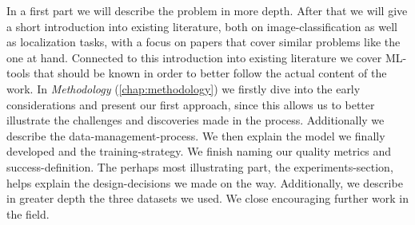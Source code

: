In a first part we will describe the problem in more depth. After that we will give a short introduction into existing literature, both on image-classification as well as localization tasks, with a focus on papers that cover similar problems like the one at hand. Connected to this introduction into existing literature we cover ML-tools that should be known in order to better follow the actual content of the work. 
In \emph{Methodology} (\ref{chap:methodology}) we firstly dive into the early considerations and present our first approach, since this allows us to better illustrate the challenges and discoveries made in the process. Additionally we describe the data-management-process.
We then explain the model we finally developed and the training-strategy. We finish naming our quality metrics and success-definition.
The perhaps most illustrating part, the experiments-section, helps explain the design-decisions we made on the way. Additionally, we describe in greater depth the three datasets we used. We close encouraging further work in the field.